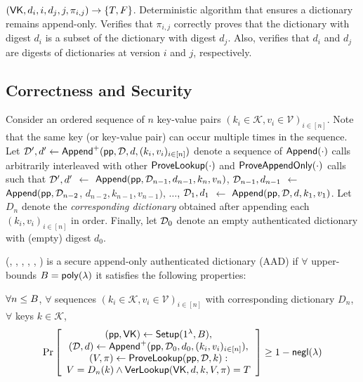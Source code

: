 \api {\verappendonly}$(\mathsf{VK}, d_i, i, d_j, j, \pi_{i,j}) \rightarrow \{T, F\}$.
Deterministic algorithm that ensures a dictionary remains append-only.
Verifies that $\pi_{i,j}$ correctly proves that the dictionary with digest $d_i$ is a subset of the dictionary with digest $d_j$.
Also, verifies that $d_i$ and $d_j$ are digests of dictionaries at version $i$ and $j$, respectively.

\subsection{Correctness and Security}
Consider an ordered sequence of $n$ key-value pairs $(k_i\in \mathcal{K}, v_i\in\mathcal{V})_{i\in [n]}$.
Note that the same key (or key-value pair) can occur multiple times in the sequence.
Let
$\mathcal{D}',d' \leftarrow \mathsf{Append}^{+}(\mathsf{pp}, \mathcal{D}, d, (k_i, v_i)_{i\in [n]})$
denote a sequence of $\mathsf{Append}(\cdot)$ calls arbitrarily interleaved with other $\mathsf{ProveLookup}(\cdot)$ and $\mathsf{ProveAppendOnly}(\cdot)$ calls such that
$\mathcal{D}',d'$ $\leftarrow$ $\mathsf{Append}(\mathsf{pp},\mathcal{D}_{n-1}, d_{n-1}, k_{n}, v_n)$,
$\mathcal{D}_{n-1}, d_{n-1}$ $\leftarrow$ $\mathsf{Append}(\mathsf{pp},\mathcal{D}_{n-2}$, $d_{n-2}, k_{n-1}, v_{n-1})$,
$\dots$,
$\mathcal{D}_{1}, d_1$ $\leftarrow$ $\mathsf{Append}(\mathsf{pp},\mathcal{D}, d, k_{1}, v_{1})$.
Let $D_n$ denote the \textit{corresponding dictionary} obtained after appending each $(k_i, v_i)_{i\in [n]}$ in order.
Finally, let $\mathcal{D}_0$ denote an empty authenticated dictionary with (empty) digest $d_0$.

\begin{definition}
    \label{d:secure-maad-definition}
    (\setup, \append, \provelookup, \proveappendonly, \verlookup, \verappendonly) is a secure append-only authenticated dictionary (AAD) if
    $\forall$ upper-bounds $B=\mathsf{poly}(\lambda)$ it satisfies the following properties:
\end{definition}

\begin{definition}
\label{def:aad:lookup-correctness}
$\forall n \le B$, $\forall$ sequences $(k_i\in \mathcal{K}, v_i\in\mathcal{V})_{i\in [n]}$ with corresponding dictionary $D_n$, $\forall$ keys $k\in\mathcal{K}$,
\begin{align*}
\Pr \left[ \begin{array}{c}
    (\pp,\vk) \leftarrow \setup(1^\lambda, \upperbound),\\
    (\AD, d) \leftarrow \multiappend(\pp, \AD_0, d_0, (k_i, v_i)_{i\in [n]}),\\
    (V, \pi) \leftarrow \provelookup(\pp,\AD, k): \\
    {V = D_n(k)} \wedge {\verlookup(\vk, d, k, V,\pi) = T}
\end{array} \right] \ge 1 - \negl(\lambda)
\end{align*}
\end{definition}

